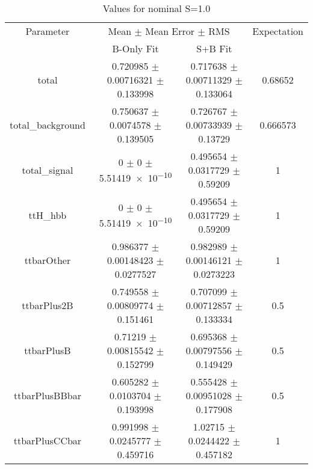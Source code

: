 \begin{table}
\centering
\caption{Values for nominal S=1.0}
\begin{tabular}{cccc}
\toprule
Parameter & \multicolumn{2}{c}{Mean $\pm$ Mean Error $\pm$ RMS} & Expectation\\
 & B-Only Fit & S+B Fit & \\
\midrule
total & \num{0.720985} $\pm$ \num{0.00716321} $\pm$ \num{0.133998} & \num{0.717638} $\pm$ \num{0.00711329} $\pm$ \num{0.133064} & \num{0.68652}\\
total\_background & \num{0.750637} $\pm$ \num{0.0074578} $\pm$ \num{0.139505} & \num{0.726767} $\pm$ \num{0.00733939} $\pm$ \num{0.13729} & \num{0.666573}\\
total\_signal & \num{0} $\pm$ \num{0} $\pm$ \num{5.51419e-10} & \num{0.495654} $\pm$ \num{0.0317729} $\pm$ \num{0.59209} & \num{1}\\
ttH\_hbb & \num{0} $\pm$ \num{0} $\pm$ \num{5.51419e-10} & \num{0.495654} $\pm$ \num{0.0317729} $\pm$ \num{0.59209} & \num{1}\\
ttbarOther & \num{0.986377} $\pm$ \num{0.00148423} $\pm$ \num{0.0277527} & \num{0.982989} $\pm$ \num{0.00146121} $\pm$ \num{0.0273223} & \num{1}\\
ttbarPlus2B & \num{0.749558} $\pm$ \num{0.00809774} $\pm$ \num{0.151461} & \num{0.707099} $\pm$ \num{0.00712857} $\pm$ \num{0.133334} & \num{0.5}\\
ttbarPlusB & \num{0.71219} $\pm$ \num{0.00815542} $\pm$ \num{0.152799} & \num{0.695368} $\pm$ \num{0.00797556} $\pm$ \num{0.149429} & \num{0.5}\\
ttbarPlusBBbar & \num{0.605282} $\pm$ \num{0.0103704} $\pm$ \num{0.193998} & \num{0.555428} $\pm$ \num{0.00951028} $\pm$ \num{0.177908} & \num{0.5}\\
ttbarPlusCCbar & \num{0.991998} $\pm$ \num{0.0245777} $\pm$ \num{0.459716} & \num{1.02715} $\pm$ \num{0.0244422} $\pm$ \num{0.457182} & \num{1}\\
\bottomrule
\end{tabular}
\end{table}
